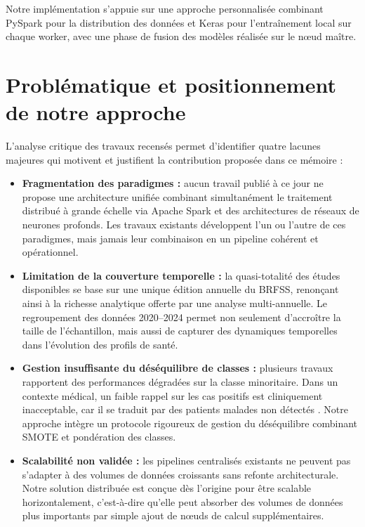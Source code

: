 \documentclass[12pt,a4paper]{report}
\begin{document}
Notre implémentation s'appuie sur une approche personnalisée combinant \acs{PySpark}
pour la distribution des données et Keras pour l'entraînement local sur chaque worker,
avec une phase de fusion des modèles réalisée sur le nœud maître.

\section{Problématique et positionnement de notre approche}

L'analyse critique des travaux recensés permet d'identifier quatre lacunes majeures
qui motivent et justifient la contribution proposée dans ce mémoire
\cite{callahan2017} :

\begin{itemize}
  \item \textbf{Fragmentation des paradigmes :} aucun travail publié à ce jour ne
    propose une architecture unifiée combinant simultanément le traitement distribué à
    grande échelle via Apache Spark et des architectures de réseaux de neurones
    profonds. Les travaux existants développent l'un ou l'autre de ces paradigmes,
    mais jamais leur combinaison en un pipeline cohérent et opérationnel.
  \item \textbf{Limitation de la couverture temporelle :} la quasi-totalité des
    études disponibles se base sur une unique édition annuelle du \acs{BRFSS},
    renonçant ainsi à la richesse analytique offerte par une analyse multi-annuelle.
    Le regroupement des données 2020--2024 permet non seulement d'accroître la taille
    de l'échantillon, mais aussi de capturer des dynamiques temporelles dans
    l'évolution des profils de santé.
  \item \textbf{Gestion insuffisante du déséquilibre de classes :} plusieurs travaux
    rapportent des performances dégradées sur la classe minoritaire. Dans un contexte
    médical, un faible rappel sur les cas positifs est cliniquement inacceptable, car
    il se traduit par des patients malades non détectés \cite{he2009}. Notre approche
    intègre un protocole rigoureux de gestion du déséquilibre combinant \acs{SMOTE} et
    pondération des classes.
  \item \textbf{Scalabilité non validée :} les pipelines centralisés existants ne
    peuvent pas s'adapter à des volumes de données croissants sans refonte
    architecturale. Notre solution distribuée est conçue dès l'origine pour être
    scalable horizontalement, c'est-à-dire qu'elle peut absorber des volumes de
    données plus importants par simple ajout de nœuds de calcul supplémentaires.
\end{itemize}
\end{document}
